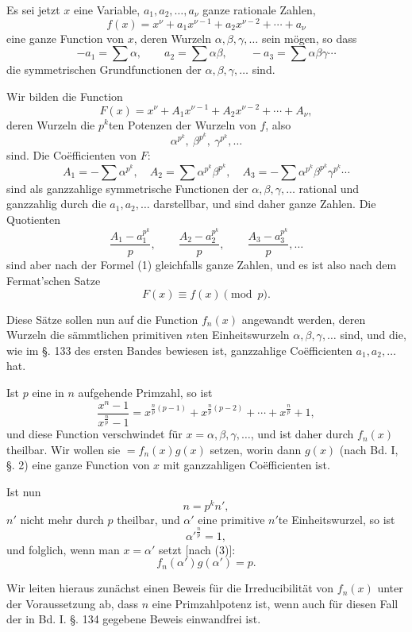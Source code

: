 \documentclass[11pt]{article}
\begin{document}
Es sei jetzt $x$ eine Variable, $a_1,a_2,
\ldots,a_\nu$ ganze rationale Zahlen,
\[
f(x)=x^\nu+a_1x^{\nu-1}+a_2x^{\nu-2}+\cdots+a_\nu
\]
eine ganze Function von $x$, deren Wurzeln $\alpha,\beta,\gamma,\ldots$ sein mögen, so dass
\[
-a_1=\sum\alpha,\qquad a_2=\sum\alpha\beta,\qquad -a_3=\sum\alpha\beta\gamma\cdots
\]
die symmetrischen Grundfunctionen der $\alpha,\beta,\gamma,\ldots$ sind.

Wir bilden die Function
\[
F(x)=x^\nu+A_1x^{\nu-1}+A_2x^{\nu-2}+\cdots+A_\nu,
\]
deren Wurzeln die $p^k$ten Potenzen der Wurzeln von $f$, also
\[
\alpha^{p^k},\ \beta^{p^k},\ \gamma^{p^k},\ldots
\]
sind. Die Coëfficienten von $F$:
\[
A_1=-\sum\alpha^{p^k},\quad
A_2=\sum\alpha^{p^k}\beta^{p^k},\quad
A_3=-\sum\alpha^{p^k}\beta^{p^k}\gamma^{p^k}\cdots
\]
sind als ganzzahlige symmetrische Functionen der $\alpha,\beta,\gamma,\ldots$ rational und ganzzahlig durch die $a_1,a_2,\ldots$ darstellbar, und sind daher ganze Zahlen. Die Quotienten
\[
\frac{A_1-a_1^{p^k}}{p},\qquad
\frac{A_2-a_2^{p^k}}{p},\qquad
\frac{A_3-a_3^{p^k}}{p},\ldots
\]
sind aber nach der Formel (1) gleichfalls ganze Zahlen, und es ist also nach dem Fermat'schen Satze
\begin{equation}\tag{2}
F(x)\equiv f(x) \pmod p.
\end{equation}

Diese Sätze sollen nun auf die Function $f_n(x)$ angewandt werden, deren Wurzeln die sämmtlichen primitiven $n$ten Einheitswurzeln $\alpha,\beta,\gamma,\ldots$ sind,
 und die, wie im §. 133 des ersten Bandes bewiesen ist, ganzzahlige Coëfficienten $a_1,a_2,\ldots$ hat.

Ist $p$ eine in $n$ aufgehende Primzahl, so ist
\begin{equation}\tag{3}
\frac{x^n-1}{x^{\frac np}-1}
=x^{\frac np(p-1)}+x^{\frac np(p-2)}+\cdots+x^{\frac np}+1,
\end{equation}
und diese Function verschwindet für $x=\alpha,\beta,\gamma,\ldots$, und ist daher durch $f_n(x)$ theilbar. Wir wollen sie $=f_n(x)g(x)$ setzen, worin dann $g(x)$ (nach Bd. I, §. 2) eine ganze Function von $x$ mit ganzzahligen Coëfficienten ist.

Ist nun
\[
n=p^k n',
\]
$n'$ nicht mehr durch $p$ theilbar, und $\alpha'$ eine primitive $n'$te Einheitswurzel, so ist
\[
\alpha'^{\frac np}=1,
\]
und folglich, wenn man $x=\alpha'$ setzt [nach (3)]:
\begin{equation}\tag{4}
f_n(\alpha')g(\alpha')=p.
\end{equation}

Wir leiten hieraus zunächst einen Beweis für die Irreducibilität von $f_n(x)$ unter der Voraussetzung ab, dass $n$ eine Primzahlpotenz ist, wenn auch für diesen Fall der in Bd. I. §. 134 gegebene Beweis einwandfrei ist.
\end{document}
